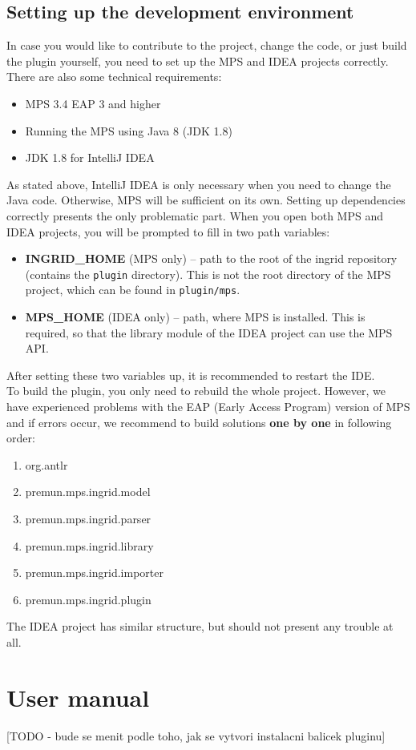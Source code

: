 \subsection{Setting up the development environment}

In case you would like to contribute to the project, change the code, or just build the plugin yourself, you need to set up the MPS and IDEA projects correctly.
There are also some technical requirements:

\begin{itemize}
	\item MPS 3.4 EAP 3 and higher
	\item Running the MPS using Java 8 (JDK 1.8)
	\item JDK 1.8 for IntelliJ IDEA
\end{itemize}

As stated above, IntelliJ IDEA is only necessary when you need to change the Java code.
Otherwise, MPS will be sufficient on its own.
Setting up dependencies correctly presents the only problematic part.
When you open both MPS and IDEA projects, you will be prompted to fill in two path variables:

\begin{itemize}
	\item \textbf{INGRID{\_}HOME} (MPS only) -- path to the root of the ingrid repository (contains the \texttt{plugin} directory). This is not the root directory of the MPS project, which can be found in \texttt{plugin/mps}.
	
	\item \textbf{MPS{\_}HOME} (IDEA only) -- path, where MPS is installed. This is required, so that the library module of the IDEA project can use the MPS API.
\end{itemize}

After setting these two variables up, it is recommended to restart the IDE.
\\

To build the plugin, you only need to rebuild the whole project.
However, we have experienced problems with the EAP (Early Access Program) version of MPS and if errors occur, we recommend to build solutions \textbf{one by one} in following order:

\begin{enumerate}
	\item org.antlr
	\item premun.mps.ingrid.model
	\item premun.mps.ingrid.parser
	\item premun.mps.ingrid.library
	\item premun.mps.ingrid.importer
	\item premun.mps.ingrid.plugin
\end{enumerate}

The IDEA project has similar structure, but should not present any trouble at all.

\section{User manual}

[TODO - bude se menit podle toho, jak se vytvori instalacni balicek pluginu]
